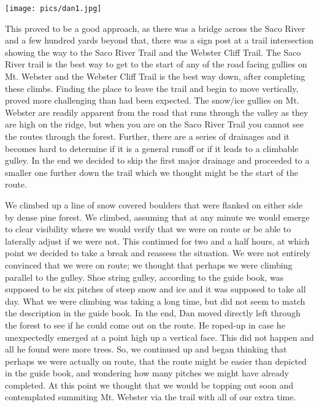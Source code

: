 \documentclass[10pt,a4paper]{article}
\newenvironment{Figure}
  {\par\medskip\noindent\minipage{\linewidth}}
  {\endminipage\par\medskip}
\begin{document}
\begin{multicols}{2}
\begin{Figure}
 \centering
 \texttt{[image: pics/dan1.jpg]}
\end{Figure}

This proved to be a good approach, as there was a bridge across the Saco River and a few hundred yards beyond that, there was a sign post at a trail intersection showing the way to the Saco River Trail and the Webster Cliff Trail.  The Saco River trail is the best way to get to the start of any of the road facing gullies on Mt. Webster and the Webster Cliff Trail is the best way down, after completing these climbs.  Finding the place to leave the trail and begin to move vertically, proved more challenging than had been expected.  The snow/ice gullies on Mt. Webster are readily apparent from the road that runs through the valley as they are high on the ridge, but when you are on the Saco River Trail you cannot see the routes through the forest.  Further, there are a series of drainages and it becomes hard to determine if it is a general runoff or if it leads to a climbable gulley.  In the end we decided to skip the first major drainage and proceeded to a smaller one further down the trail which we thought might be the start of the route.  


We climbed up a line of snow covered boulders that were flanked on either side by dense pine forest.  We climbed, assuming that at any minute we would emerge to clear visibility where we would verify that we were on route or be able to laterally adjust if we were not.  This continued for two and a half hours, at which point we decided to take a break and reassess the situation.  We were not entirely convinced that we were on route; we thought that perhaps we were climbing parallel to the gulley.  Shoe string gulley, according to the guide book, was supposed to be six pitches of steep snow and ice and it was supposed to take all day.  What we were climbing was taking a long time, but did not seem to match the description in the guide book.  In the end, Dan moved directly left through the forest to see if he could come out on the route.  He roped-up in case he unexpectedly emerged at a point high up a vertical face.  This did not happen and all he found were more trees.  So, we continued up and began thinking that perhaps we were actually on route, that the route might be easier than depicted in the guide book, and wondering how many pitches we might have already completed.  At this point we thought that we would be topping out soon and contemplated summiting Mt. Webster via the trail with all of our extra time. 


\end{multicols}
\end{document}
